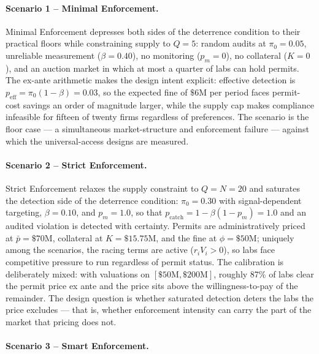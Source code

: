 \paragraph{Scenario 1 -- Minimal Enforcement.}

Minimal Enforcement depresses both sides of the deterrence condition to their practical floors while constraining supply to $Q = 5$: random audits at $\pi_0 = 0.05$, unreliable measurement ($\beta = 0.40$), no monitoring ($p_m = 0$), no collateral ($K = 0$), and an auction market in which at most a quarter of labs can hold permits. The ex-ante arithmetic makes the design intent explicit: effective detection is $p_{\mathrm{eff}} = \pi_0(1-\beta) = 0.03$, so the expected fine of $\$6$M per period faces permit-cost savings an order of magnitude larger, while the supply cap makes compliance infeasible for fifteen of twenty firms regardless of preferences. The scenario is the floor case --- a simultaneous market-structure and enforcement failure --- against which the universal-access designs are measured.

\paragraph{Scenario 2 -- Strict Enforcement.}

Strict Enforcement relaxes the supply constraint to $Q = N = 20$ and saturates the detection side of the deterrence condition: $\pi_0 = 0.30$ with signal-dependent targeting, $\beta = 0.10$, and $p_m = 1.0$, so that $p_{\mathrm{catch}} = 1 - \beta(1-p_m) = 1.0$ and an audited violation is detected with certainty. Permits are administratively priced at $\bar{p} = \$70$M, collateral at $K = \$15.75$M, and the fine at $\phi = \$50$M; uniquely among the scenarios, the racing terms are active ($r_i V_i > 0$), so labs face competitive pressure to run regardless of permit status. The calibration is deliberately mixed: with valuations on $[\$50\text{M}, \$200\text{M}]$, roughly 87\% of labs clear the permit price ex ante and the price sits above the willingness-to-pay of the remainder. The design question is whether saturated detection deters the labs the price excludes --- that is, whether enforcement intensity can carry the part of the market that pricing does not.

\paragraph{Scenario 3 -- Smart Enforcement.}

